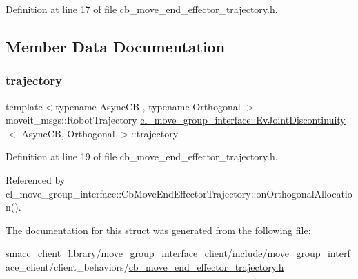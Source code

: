 Definition at line 17 of file cb\+\_\+move\+\_\+end\+\_\+effector\+\_\+trajectory.\+h.



\subsection{Member Data Documentation}
\mbox{\label{structcl__move__group__interface_1_1EvJointDiscontinuity_a6ccc8c9247d286b2c7dae1746357831b}} 
\subsubsection{\texorpdfstring{trajectory}{trajectory}}
{\footnotesize\ttfamily template$<$typename Async\+CB , typename Orthogonal $>$ \\
moveit\+\_\+msgs\+::\+Robot\+Trajectory \hyperlink{structcl__move__group__interface_1_1EvJointDiscontinuity}{cl\+\_\+move\+\_\+group\+\_\+interface\+::\+Ev\+Joint\+Discontinuity}$<$ Async\+CB, Orthogonal $>$\+::trajectory}



Definition at line 19 of file cb\+\_\+move\+\_\+end\+\_\+effector\+\_\+trajectory.\+h.



Referenced by cl\+\_\+move\+\_\+group\+\_\+interface\+::\+Cb\+Move\+End\+Effector\+Trajectory\+::on\+Orthogonal\+Allocation().



The documentation for this struct was generated from the following file\+:\begin{DoxyCompactItemize}
\item 
smacc\+\_\+client\+\_\+library/move\+\_\+group\+\_\+interface\+\_\+client/include/move\+\_\+group\+\_\+interface\+\_\+client/client\+\_\+behaviors/\hyperlink{cb__move__end__effector__trajectory_8h}{cb\+\_\+move\+\_\+end\+\_\+effector\+\_\+trajectory.\+h}\end{DoxyCompactItemize}
